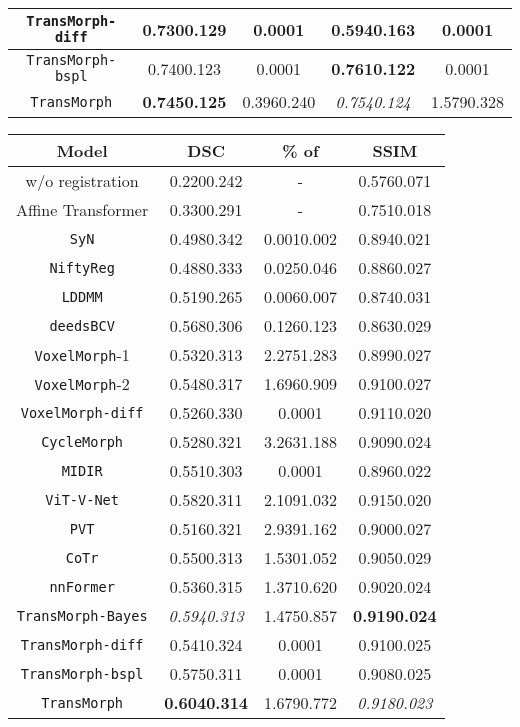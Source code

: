 \documentclass[times,twocolumn,final]{elsarticle}
\begin{document}
\begin{table*}[!t]
{\begin{tabular}{ c | c | c | c | c}
 \texttt{TransMorph-diff} & 0.7300.129 & 0.0001& 0.5940.163 & 0.0001\\
 \hline
 \texttt{TransMorph-bspl} & 0.7400.123 & 0.0001& \textbf{0.7610.122}& 0.0001\\
 \hline
 \texttt{TransMorph} & \textbf{0.7450.125}& 0.3960.240& \textit{0.7540.124}& 1.5790.328\\
 \hline
\end{tabular}
\label{tab:table_res}}
\quad
\fontsize{7.5}{9}\selectfont
\parbox{0.5\linewidth}{
\centering
\caption{Quantitative evaluation results of XCAT-to-CT registration. Dice score of 16 organs, percentage of voxels with a non-positive Jacobian determinant (i.e., folded voxels), and SSIM are evaluated for different methods. The \textbf{bolded} numbers denote the highest scores, while the \textit{italicized} ones indicate the second highest.}
\label{tab:table_res_XCAT}
\begin{tabular}{ c | c | c | c }
 \hline
 Model & DSC & \% of  & SSIM\\\hline
 w/o registration & 0.2200.242 & - & 0.5760.071 \\
 \hline
 Affine Transformer & 0.3300.291 & - & 0.7510.018 \\
 \hline
 \texttt{SyN}& 0.4980.342 & 0.0010.002 & 0.8940.021 \\\hline
 \texttt{NiftyReg}& 0.4880.333 & 0.0250.046 & 0.8860.027\\\hline
 \texttt{LDDMM} & 0.5190.265 & 0.0060.007 & 0.8740.031\\\hline
 \texttt{deedsBCV}& 0.5680.306 & 0.1260.123 & 0.8630.029\\\hline
 \texttt{VoxelMorph}-1 & 0.5320.313 & 2.2751.283 & 0.8990.027\\\hline
 \texttt{VoxelMorph}-2 & 0.5480.317 & 1.6960.909  & 0.9100.027\\\hline
 \texttt{VoxelMorph-diff} & 0.5260.330 & 0.0001  & 0.9110.020\\\hline
 \texttt{CycleMorph} & 0.5280.321 & 3.2631.188  & 0.9090.024\\\hline
 \texttt{MIDIR} & 0.5510.303 & 0.0001 & 0.8960.022\\\hline
 \texttt{ViT-V-Net} & 0.5820.311 & 2.1091.032 & 0.9150.020\\
 \hline
 \texttt{PVT} & 0.5160.321 & 2.9391.162 & 0.9000.027\\
 \hline
 \texttt{CoTr} & 0.5500.313 & 1.5301.052 & 0.9050.029\\\hline
 \texttt{nnFormer} & 0.5360.315 & 1.3710.620 & 0.9020.024\\
 \hline
 \hline
 \texttt{TransMorph-Bayes} & \textit{0.5940.313} & 1.4750.857 & \textbf{0.919}\textbf{0.024}\\
 \hline
 \texttt{TransMorph-diff} & 0.5410.324 & 0.0001 &0.9100.025\\
 \hline
 \texttt{TransMorph-bspl} & 0.5750.311 & 0.0001 & 0.9080.025\\
 \hline
 \texttt{TransMorph} & \textbf{0.6040.314} & 1.6790.772 & \textit{0.918}\textit{0.023}\\\hline
\end{tabular}}
\end{table*}
\end{document}
